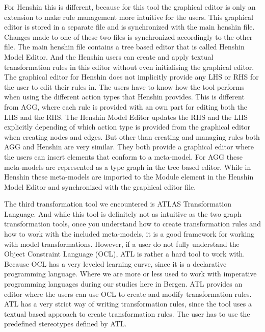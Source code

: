 For Henshin this is different, because for this tool the graphical editor
is only an extension to make rule management more intuitive for the users. This
graphical editor is stored in a separate file and is synchronized with the main
henshin file. Changes made to one of these two files is synchronized
accordingly to the other file. The main henshin file contains a tree based
editor that is called Henshin Model Editor. And the Henshin users can create and
apply textual transformation rules in this editor without even initialising the
graphical editor. The graphical editor for Henshin does not implicitly provide
any LHS or RHS for the user to edit their rules in. The users have to know how the tool
performs when using the different action types that Henshin provides. This is
different from AGG, where each rule is provided with an own part for editing
both the LHS and the RHS. The Henshin Model Editor updates the RHS and the LHS
explicitly depending of which action type is provided from the graphical
editor when creating nodes and edges. But other than creating and managing
rules both AGG and Henshin are very similar. They both provide a graphical editor where
the users can insert elements that conform to a meta-model. For AGG these
meta-models are represented as a type graph in the tree based editor. While in
Henshin these meta-models are imported to the Module element in the Henshin Model
Editor and synchronized with the graphical editor file.

The third transformation tool we encountered is ATLAS Transformation Language.
And while this tool is definitely not as intuitive as the two graph
transformation tools, once you understand how to create transformation rules
and how to work with the included meta-models, it is a good framework for
working with model transformations. However, if a user do not fully understand
the Object Constraint Language (OCL), ATL is rather a hard tool to work with.
Because OCL has a very leveled learning curve, since it is a declarative
programming language. Where we are more or less used to work with imperative
programming languages during our studies here in Bergen. ATL provides an editor
where the users can use OCL to create and modify transformation rules. ATL has
a very strict way of writing transformation rules, since the tool uses a
textual based approach to create transformation rules. The user has to use the
predefined stereotypes defined by ATL.


